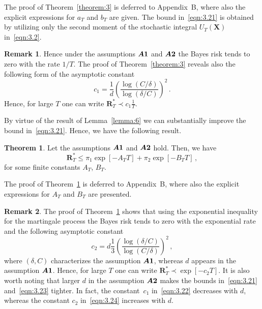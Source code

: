 \documentclass[lettersize,journal,onecolumn]{IEEEtran}
\theoremstyle{definition}
\newtheorem{theorem}{Theorem}
\newtheorem{remark}{Remark}
\newcommand{\assumption}[1]{{\rm \boldsymbol{A#1}}}
\begin{document}
The proof of Theorem~\ref{theorem:3} is deferred to Appendix~B, where also the
explicit expressions for $a_{T}$ and $b_{T}$ are given. 
The bound in~\eqref{eqn:3.21} is obtained by utilizing only the second
moment of the stochastic integral $U_{T}(\mathbf{X})$
in~\eqref{eqn:3.2}.
\begin{remark}
	\label{remark:1}
	Hence under the assumptions $\assumption{1}$ and $\assumption{2}$ the Bayes risk tends
	to zero with the rate $1/T$. The proof of Theorem~\ref{theorem:3} reveals also the
	following form of the asymptotic constant
	\begin{equation}
		c_{1} = \frac{1}{d} \left(
		\frac{\log(C/\delta)}{\log(\delta/C)}
		\right)^{2}
		\label{eqn:3.22} \,.
	\end{equation}
	Hence, for large $T$ one can write $\mathbf{R}_{T}^{*} \prec c_{1}\frac{1}{T}$.
\end{remark}

By virtue of the result of Lemma~\ref{lemma:6} we can substantially improve the bound
in~\eqref{eqn:3.21}. Hence, we have the following result.
\begin{theorem}
	\label{theorem:4}
	Let the assumptions $\assumption{1}$ and $\assumption{2}$ hold. Then, we have
	\begin{equation}
		\mathbf{R}_{T}^{*}  \leq
		\pi_{1}\exp\left[-A_{T}T\right] + \pi_{2}\exp\left[-B_{T}T\right]
		\label{eqn:3.23} \,,
	\end{equation}
	for some finite constants $A_{T}$, $B_{T}$.
\end{theorem}

The proof of Theorem~\ref{theorem:4} is deferred to Appendix~B, where also the
explicit expressions for $A_{T}$ and $B_{T}$ are presented.

\begin{remark}
	\label{remark:2}
	The proof of Theorem~\ref{theorem:4} shows that using the exponential inequality
	for the martingale process the Bayes risk tends to zero with the exponential
	rate and the	following asymptotic constant
	\begin{equation}
		c_{2} = d\frac{1}{3}\left(
		\frac{\log(\delta/C)}{\log(C/\delta)}
		\right)^{2}
		\label{eqn:3.24} \,,			
	\end{equation}
	where $(\delta,C)$ characterizes the assumption $\assumption{1}$, whereas $d$ appears
	in the assumption $\assumption{1}$. Hence, for large $T$ one can write \mbox{$
		\mathbf{R}_{T}^{*} \prec \exp\left[-c_{2}T\right]
		$}.
	It is also worth noting that larger $d$ in the assumption $\assumption{2}$ makes the
	bounds in~\eqref{eqn:3.21} and~\eqref{eqn:3.23} tighter. In fact, the constant~$c_{1}$
	in~\eqref{eqn:3.22} decreases with $d$, whereas the constant
	$c_{2}$ in~\eqref{eqn:3.24} increases with $d$.
\end{remark}
\end{document}
